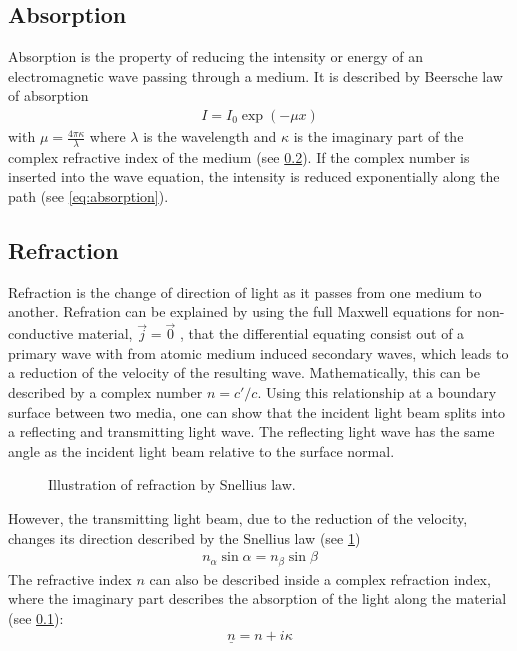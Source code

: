 \subsection{Absorption}\label{sec:theoAbsorption}
%
Absorption is the property of reducing the intensity or energy of an electromagnetic wave passing through a medium.
It is described by Beersche law of absorption
% 
\begin{align} 
    I = I_0 \exp(-\mu x) \label{eq:absorption}
\end{align}
%
with $\mu = \frac{4\pi \kappa}{\lambda}$ where $\lambda$ is the wavelength and $\kappa$ is the imaginary part of the complex refractive index of the medium (see \cref{sec:theoRefraction}).
If the complex number is inserted into the wave equation, the intensity is reduced exponentially along the path (see \cref{eq:absorption}).
%
% 
% 
\subsection{Refraction}\label{sec:theoRefraction}
%
Refraction is the change of direction of light as it passes from one medium to another.
Refration can be explained by using the full Maxwell equations  for non-conductive material, \ie{} $\vec{j} = \vec{0}$ , that the differential equating consist out of a primary wave with from atomic medium induced secondary waves, which leads to a reduction of the velocity of the resulting wave.
Mathematically, this can be described by a complex number $n = c' / c$.
Using this relationship at a boundary surface between two media, one can show that the incident light beam splits into a reflecting and transmitting light wave.
The reflecting light wave has the same angle as the incident light beam relative to the surface normal.
%
\begin{figure}[!t]
\centering
\setlength{\tikzwidth}{\textwidth}
\caption{Illustration of refraction by Snellius law.}
\label{fig:optic_refraction}
\end{figure}
% 
However, the transmitting light beam, due to the reduction of the velocity, changes its direction described by the Snellius law (see \cref{fig:optic_refraction})
\begin{align}
    n_\alpha \sin \alpha = n_\beta \sin \beta \label{eq:Snellius}
\end{align}
% 
The refractive index $n$ can also be described inside a complex refraction index, where the imaginary part describes the absorption of the light along the material (see \cref{sec:theoAbsorption}):
% 
\begin{align}
\underline{n} = n + i\kappa
\end{align}
% 
%
%
